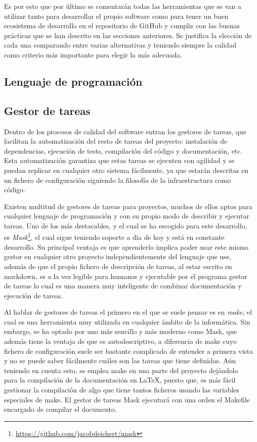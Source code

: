 Es por esto que por último se comentarán todas las herramientas que se van a
utilizar tanto para desarrollar el propio software como para tener un buen
ecosistema de desarrollo en el repositorio de GitHub y cumplir con las buenas
prácticas que se han descrito en las secciones anteriores. Se justifica la
elección de cada una comparando entre varias alternativas y teniendo siempre la
calidad como criterio más importante para elegir la más adecuada.

\subsection{Lenguaje de programación}

\subsection{Gestor de tareas}
Dentro de los procesos de calidad del software entran los gestores de tareas,
que facilitan la automatización del resto de tareas del proyecto: instalación de
dependencias, ejecución de tests, compilación del código y documentación, etc.
Esta automatización garantiza que estas tareas se ejecuten con agilidad y se
puedan replicar en cualquier otro sistema fácilmente, ya que estarán descritas
en un fichero de configuración siguiendo la filosofía de la infraestructura como
código.

Existen multitud de gestores de tareas para proyectos, muchos de ellos aptos
para cualquier lenguaje de programación y con su propio modo de describir y
ejecutar tareas. Uno de los más destacables, y el cual se ha escogido para este
desarrollo, es
\textit{Mask}\footnote{\url{https://github.com/jacobdeichert/mask}}, el cual
sigue teniendo soporte a día de hoy y está en constante desarrollo. Su principal
ventaja es que aprenderlo implica poder usar este mismo gestor en cualquier otro
proyecto independientemente del lenguaje que use, además de que el propio
fichero de descripción de tareas, al estar escrito en markdown, es a la vez
legible para humanos y ejecutable por el programa gestor de tareas lo cual es
una manera muy inteligente de combinar documentación y ejecución de tareas.

Al hablar de gestores de tareas el primero en el que se suele pensar es en
\textit{make}, el cual es una herramienta muy utilizada en cualquier ámbito de
la informática. Sin embargo, se ha optado por uno más sencillo y más moderno
como Mask, que además tiene la ventaja de que es autodescriptivo, a diferencia
de make cuyo fichero de configuración suele ser bastante complicado de entender
a primera vista y no se puede saber fácilmente cuáles son las tareas que tiene
definidas. Aún teniendo en cuenta esto, se emplea make en una parte del proyecto
dejándolo para la compilación de la documentación en LaTeX, puesto que, es más
fácil gestionar la compilación de algo que tiene tantos ficheros usando las
variables especiales de make. El gestor de tareas Mask ejecutará con una orden
el Makefile encargado de compilar el documento.

